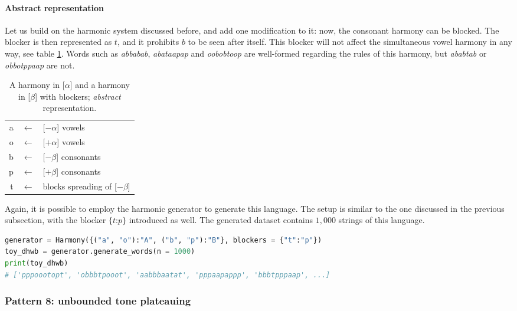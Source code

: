 \paragraph{Abstract representation}

Let us build on the harmonic system discussed before, and add one modification to it: now, the consonant harmony can be blocked.
The blocker is then represented as $t$, and it prohibits $b$ to be seen after itself.
This blocker will not affect the simultaneous vowel harmony in any way, see table \ref{dhwbmap}.
Words such as \emph{abbabab}, \emph{abataapap} and \emph{oobobtoop} are well-formed regarding the rules of this harmony, but \emph{ababtab} or \emph{obbotppaap} are not.

\begin{table}[h!]
\begin{center}
\begin{tabular}{rcl}
a & $\leftarrow$ & {[}$-\alpha${]} vowels \\
o & $\leftarrow$ & {[}$+\alpha${]} vowels \\
b & $\leftarrow$ & {[}$-\beta${]} consonants \\
p & $\leftarrow$ & {[}$+\beta${]} consonants \\
t & $\leftarrow$ & blocks spreading of {[}$-\beta${]}
\end{tabular}
\end{center}
\caption{A harmony in {[}$\alpha${]} and a harmony in {[}$\beta${]} with blockers; \emph{abstract} representation.}
\label{dhwbmap}
\end{table}

Again, it is possible to employ the harmonic generator to generate this language.
The setup is similar to the one discussed in the previous subsection, with the blocker $\{t$:$p\}$ introduced as well.
The generated dataset contains $1,000$ strings of this language.

\begin{lstlisting}[language=Python]
generator = Harmony({("a", "o"):"A", ("b", "p"):"B"}, blockers = {"t":"p"})
toy_dhwb = generator.generate_words(n = 1000)
print(toy_dhwb)
# ['pppoootopt', 'obbbtpooot', 'aabbbaatat', 'pppaapappp', 'bbbtpppaap', ...]
\end{lstlisting}

\subsubsection{Pattern 8: unbounded tone plateauing}


